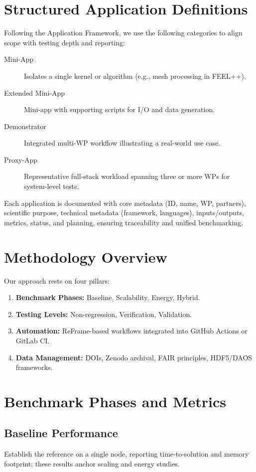 \section{Structured Application Definitions}
Following the Application Framework, we use the following categories to align scope with testing depth and reporting:

\begin{description}
  \item[Mini-App] Isolates a single kernel or algorithm (e.g., mesh processing in FEEL++).
  \item[Extended Mini-App] Mini-app with supporting scripts for I/O and data generation.
  \item[Demonstrator] Integrated multi-WP workflow illustrating a real-world use case.
  \item[Proxy-App] Representative full-stack workload spanning three or more WPs for system-level tests.
\end{description}

Each application is documented with core metadata (ID, name, WP, partners), scientific purpose, technical metadata (framework, languages), inputs/outputs, metrics, status, and planning, ensuring traceability and unified benchmarking.

\section{Methodology Overview}
Our approach rests on four pillars:
\begin{enumerate}
  \item \textbf{Benchmark Phases:} Baseline, Scalability, Energy, Hybrid.
  \item \textbf{Testing Levels:} Non-regression, Verification, Validation.
  \item \textbf{Automation:} ReFrame-based workflows integrated into GitHub Actions or GitLab CI.
  \item \textbf{Data Management:} DOIs, Zenodo archival, FAIR principles, HDF5/DAOS frameworks.
\end{enumerate}

\section{Benchmark Phases and Metrics}
\subsection{Baseline Performance}
Establish the reference on a single node, reporting time-to-solution and memory footprint; these results anchor scaling and energy studies.

